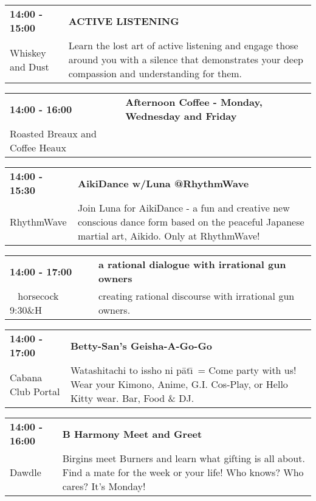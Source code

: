 \begin{tabular}{ p{1in} p{2.2in} }
    \textbf{14:00 - 15:00} & \textbf{ACTIVE LISTENING} \\
    Whiskey and Dust \newline  & Learn the lost art of active listening and engage those around you with a silence that demonstrates your deep compassion and understanding for them. \\
    \hline 
\end{tabular}
    
\begin{tabular}{ p{1in} p{2.2in} }
    \textbf{14:00 - 16:00} & \textbf{Afternoon Coffee - Monday, Wednesday and Friday} \\
    Roasted Breaux and Coffee Heaux \newline  &  \\
    \hline 
\end{tabular}
    
\begin{tabular}{ p{1in} p{2.2in} }
    \textbf{14:00 - 15:30} & \textbf{AikiDance w/Luna @RhythmWave} \\
    RhythmWave \newline  & Join Luna for AikiDance - a fun and creative new conscious dance form based on the peaceful Japanese martial art, Aikido. Only at RhythmWave! \\
    \hline 
\end{tabular}
    
\begin{tabular}{ p{1in} p{2.2in} }
    \textbf{14:00 - 17:00} & \textbf{a rational dialogue with irrational gun owners} \\
    ~ \newline horsecock 9:30\&H & creating rational discourse with irrational gun owners. \\
    \hline 
\end{tabular}
    
\begin{tabular}{ p{1in} p{2.2in} }
    \textbf{14:00 - 17:00} & \textbf{Betty-San's Geisha-A-Go-Go } \\
    Cabana Club \newline 430 Portal & Watashitachi to issho ni p\=at\=\i\ = Come party with us! Wear your Kimono, Anime, G.I. Cos-Play, or Hello Kitty wear. Bar, Food \& DJ. \\
    \hline 
\end{tabular}
    
\begin{tabular}{ p{1in} p{2.2in} }
    \textbf{14:00 - 16:00} & \textbf{B Harmony Meet and Greet} \\
    Dawdle \newline  & Birgins meet Burners and learn what gifting is all about. Find a mate for the week or your life! Who knows? Who cares? It's Monday! \\
    \hline 
\end{tabular}
    
